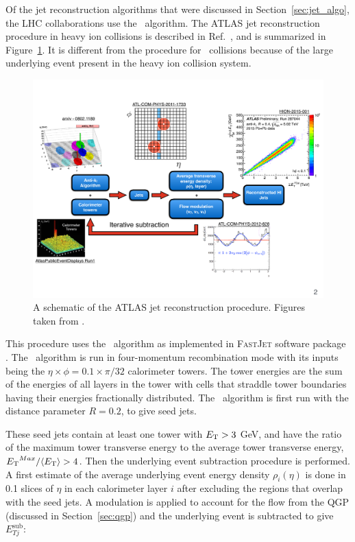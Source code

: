 Of the jet reconstruction algorithms that were discussed in Section~\ref{sec:jet_algo}, the LHC collaborations use the \antikt\ algorithm.
The ATLAS jet reconstruction procedure in heavy ion collisions is described in Ref.~\cite{2019108}, and is summarized in Figure~\ref{fig:atlasHIjetreco}.
It is different from the procedure for \pp\ collisions because of the large underlying event present in the heavy ion collision system.

\begin{figure}[htbp!]
	\centering
	\includegraphics[width=\textwidth]{figures/setup/atlasHIjetReco} %
	\caption{A schematic of the ATLAS jet reconstruction procedure.
	Figures taken from \cite{Cacciari:2008gp, atlasRun1EventDisplay, ATLAS-COM-PHYS-2011-1733, Cole:1450219, perfPlots}.}	
	\label{fig:atlasHIjetreco}%
\end{figure}

This procedure uses the \antikt\ algorithm as implemented in \textsc{FastJet} software package \cite{fastjet_algo}.
The \antikt\ algorithm is run in four-momentum recombination mode with its inputs being the $\eta \times \phi = 0.1 \times \pi / 32$ calorimeter towers.
The tower energies are the sum of the energies of all layers in the tower with cells that straddle tower boundaries having their energies fractionally distributed.
The \antikt\ algorithm is first run with the distance parameter $R=0.2$, to give seed jets.

These seed jets contain at least one tower with $\mbox{$E_{\mathrm{T}}$} > 3$ GeV, and have the ratio of the maximum tower transverse energy to the average tower transverse energy, $\mbox{$E_{\mathrm{T}}$}^{Max} / \langle \mbox{$E_{\mathrm{T}}$} \rangle > 4$.
Then the underlying event subtraction procedure is performed.
A first estimate of the average underlying event energy density $\rho_i (\eta)$ is done in 0.1 slices of $\eta$ in each calorimeter layer $i$ after excluding the regions that overlap with the seed jets.
A modulation is applied to account for the flow from the QGP (discussed in Section~\ref{sec:qgp}) and the underlying event is subtracted to give $E_{Tj}^{\mathrm{sub}}$:

